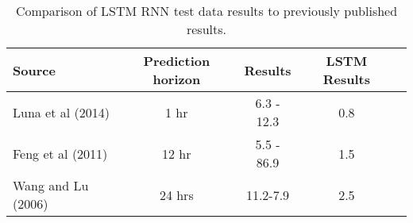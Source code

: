 \begin{table}[]
\centering
\caption{Comparison of LSTM RNN test data results to previously published results.}
\label{tb:compare}
\begin{tabular}{@{}lcccc@{}}
\toprule
\textbf{Source} &  \textbf{Prediction horizon} & \textbf{Results} & \textbf{LSTM Results} \\ \midrule
Luna et al (2014) & 1 hr & 6.3 - 12.3 & 0.8 \\
Feng et al (2011) &  12 hr & 5.5 - 86.9 & 1.5 \\
Wang and Lu (2006) & 24 hrs & 11.2-7.9 & 2.5 \\ \bottomrule
\end{tabular}
\end{table}